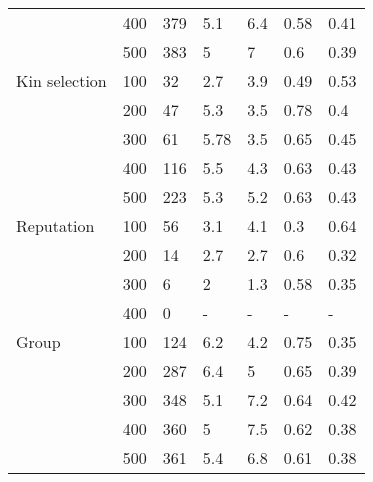 \begin{table}[]
\begin{tabular}{@{}lllllll@{}}
& 400  & 379   & 5.1                       & 6.4                       & 0.58                      & 0.41          \\
& 500  & 383   & 5                         & 7                         & 0.6                       & 0.39          \\\midrule
Kin selection  & 100  & 32    & 2.7                       & 3.9                       & 0.49                      & 0.53          \\
& 200  & 47    & 5.3                       & 3.5                       & 0.78                      & 0.4           \\
& 300  & 61    & 5.78                      & 3.5                       & 0.65                      & 0.45          \\
& 400  & 116   & 5.5                       & 4.3                       & 0.63                      & 0.43          \\
& 500  & 223   & 5.3                       & 5.2                       & 0.63                      & 0.43          \\\midrule
Reputation     & 100  & 56    & 3.1                       & 4.1                       & 0.3                       & 0.64          \\
& 200  & 14    & 2.7                       & 2.7                       & 0.6                       & 0.32          \\
& 300  & 6     & 2                         & 1.3                       & 0.58                      & 0.35          \\
& 400  & 0     & -                         & -                         & -                         & -             \\\midrule
Group          & 100  & 124   & 6.2                       & 4.2                       & 0.75                      & 0.35          \\
& 200  & 287   & 6.4                       & 5                         & 0.65                      & 0.39          \\
& 300  & 348   & 5.1                       & 7.2                       & 0.64                      & 0.42          \\
& 400  & 360   & 5                         & 7.5                       & 0.62                      & 0.38          \\
& 500  & 361   & 5.4                       & 6.8                       & 0.61                      & 0.38          \\\midrule

\end{tabular}
\end{table}
